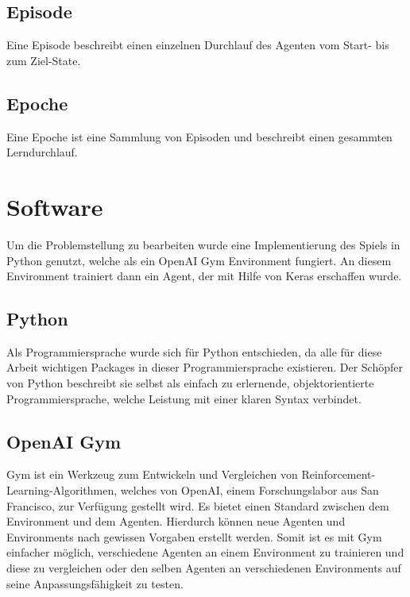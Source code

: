 \subsection{Episode}
Eine Episode beschreibt einen einzelnen Durchlauf des Agenten vom Start- bis zum Ziel-State.

\subsection{Epoche}
Eine Epoche ist eine Sammlung von Episoden und beschreibt einen gesammten Lerndurchlauf.





\section{Software}
Um die Problemstellung zu bearbeiten wurde eine Implementierung des Spiels in Python genutzt, welche als ein OpenAI Gym Environment fungiert. An diesem Environment trainiert dann ein Agent, der mit Hilfe von  Keras erschaffen wurde.

\subsection{Python}
Als Programmiersprache wurde sich für Python\cite{python} entschieden, da alle für diese Arbeit wichtigen Packages in dieser Programmiersprache existieren.
Der Schöpfer von Python beschreibt sie selbst als einfach zu erlernende, objektorientierte Programmiersprache, welche Leistung mit einer klaren Syntax verbindet.\cite{PythonManual2009} \\

\newpage
\subsection{OpenAI Gym}
Gym \cite{gym} ist ein Werkzeug zum Entwickeln und Vergleichen von Reinforcement-Learning-Algorithmen, welches von OpenAI, einem Forschungslabor aus San Francisco, zur Verfügung gestellt wird. Es bietet einen Standard zwischen dem Environment und dem Agenten. Hierdurch können neue Agenten und Environments nach gewissen Vorgaben erstellt werden. Somit ist es mit Gym einfacher möglich, verschiedene Agenten an einem Environment zu trainieren und diese zu vergleichen oder den selben Agenten an verschiedenen Environments auf seine Anpassungsfähigkeit zu testen.


